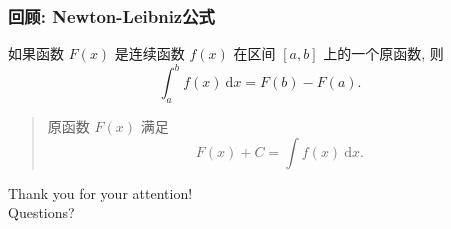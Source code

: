 \documentclass[
10pt,
aspectratio=43,
]{beamer}
\begin{document}
\begin{frame}
	\frametitle{回顾: Newton-Leibniz公式}

	\begin{theorem}
		如果函数 $F(x)$ 是连续函数 $f(x)$ 在区间 $[a, b]$ 上的一个原函数, 则
		$$
			\int_a^b f(x) \mathrm{~d} x=F(b)-F(a) .
		$$
	\end{theorem}
	\vspace{1cm}
	\pause
	\begin{quote}
		原函数 $F(x)$ 满足
		$$
			F (x)+C=\int f(x)\mathrm{~d}x.
		$$
	\end{quote}
\end{frame}




\begin{frame}[plain]
	\vfill
	\centering
	{
		\centering \Huge \color{white} Thank you for your attention!\\[10pt]Questions?
	}
	\vfill
\end{frame}
\end{document}
